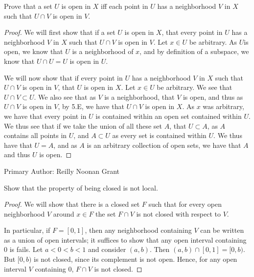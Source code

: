 \begin{minorEx}%
Prove that a set $U$ is open in $X$ iff each point in $U$ has a neighborhood $V$ in $X$ such that $U \cap V$ is open in $V$.
\end{minorEx}

\begin{proof}
  We will first show that if a set $U$ is open in $X$, that every
  point in $U$ has a neighborhood $V$ in $X$ such that $U \cap V$ is
  open in $V$. Let $x \in U$ be arbitrary. As $U$is open, we know that
  $U$ is a neighborhood of $x$, and by definition of a subspace, we
  know that $U\cap U=U$ is open in $U$.

  We will now show that if every point in $U$ has a neighborhood $V$
  in $X$ such that $U \cap V$ is open in $V$, that $U$ is open in
  $X$. Let $x \in U$ be arbitrary. We see that $U \cap V \subset
  U$. We also see that as $V$ is a neighborhood, that $V$ is open, and
  thus as $U \cap V $ is open in $V$, by 5.E, we have that $U \cap V$
  is open in $X$. As $x$ was arbitrary, we have that every point in
  $U$ is contained within an open set contained within $U$. We thus
  see that if we take the union of all these set $A$, that $U\subset
  A$, as $A$ contains all points in $U$, and $A \subset U$ as every
  set is contained within $U$. We thus have that $U=A$, and as $A$ is
  an arbitrary collection of open sets, we have that $A$ and thus $U$
  is open.
\end{proof}

Primary Author: Reilly Noonan Grant

\begin{minorEx}%
Show that the property of being closed is not local.
\end{minorEx}

\begin{proof}
    We will show that there is a closed set $F$ such that for every open
    neighborhood $V$ around $x \in F$ the set $F \cap V$ is not closed with
    respect to $V$.

    In particular, if $F=[0,1]$, then any neighborhood containing $V$ can be
    written as a union of open intervals; it suffices to show that any open
    interval containing $0$ is fails. Let $a < 0 < b < 1$ and consider $(a,b)$.
    Then $(a,b) \cap [0, 1] = [0, b)$. But $[0, b)$ is not closed, since its
        complement is not open. Hence, for any open interval $V$ containing 0,
        $F \cap V$ is not closed.
\end{proof}

